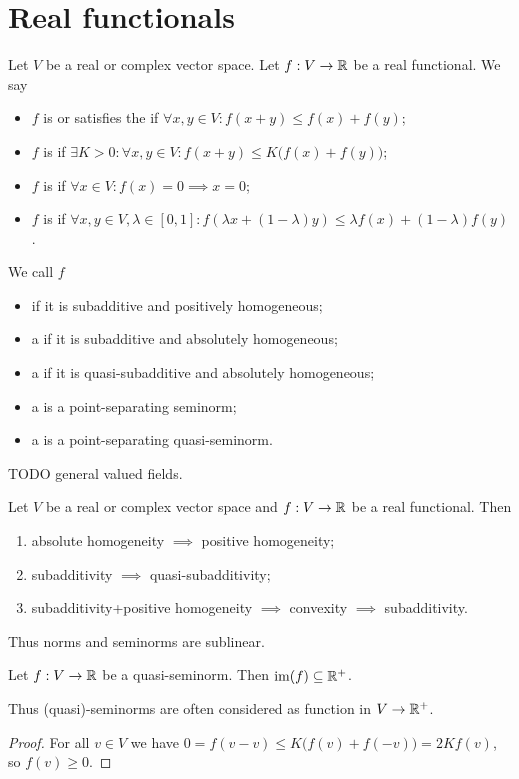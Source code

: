 \section{Real functionals}
\begin{definition}
Let $V$ be a real or complex vector space. Let $f: V\to \mathbb{R}$ be a real functional. We say
\begin{itemize}
\item $f$ is  or satisfies the  if $\forall x,y\in V: f(x+y) \leq f(x) + f(y)$;
\item $f$ is  if $\exists K>0: \forall x,y\in V: f(x+y) \leq K\big(f(x) + f(y)\big)$;
\item $f$ is  if $\forall x\in V: f(x) = 0 \implies x = 0$;
\item $f$ is  if $\forall x,y\in V, \lambda\in[0,1]: f(\lambda x + (1-\lambda)y) \leq \lambda f(x) + (1-\lambda)f(y)$.
\end{itemize}
We call $f$
\begin{itemize}
\item {} if it is subadditive and positively homogeneous;
\item a  if it is subadditive and absolutely homogeneous;
\item a  if it is quasi-subadditive and absolutely homogeneous;
\item a  is a point-separating seminorm;
\item a  is a point-separating quasi-seminorm.
\end{itemize}
\end{definition}

TODO general valued fields.

\begin{lemma}
Let $V$ be a real or complex vector space and $f: V\to \mathbb{R}$ be a real functional. Then
\begin{enumerate}
\item absolute homogeneity $\implies$ positive homogeneity;
\item subadditivity $\implies$ quasi-subadditivity;
\item subadditivity+positive homogeneity $\implies$ convexity $\implies$ subadditivity.
\end{enumerate}
\end{lemma}
Thus norms and seminorms are sublinear.

\begin{lemma} \label{seminormPositivity}
Let $f:V\to \mathbb{R}$ be a quasi-seminorm. Then $\operatorname{im}(f)\subseteq \mathbb{R}^+$.
\end{lemma}
Thus (quasi)-seminorms are often considered as function in $V\to \mathbb{R}^+$.
\begin{proof}
For all $v\in V$ we have $0 = f(v-v) \leq K\big(f(v)+f(-v)\big) = 2Kf(v)$, so $f(v) \geq 0$.
\end{proof}

